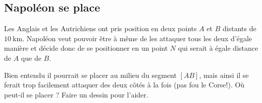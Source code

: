 
\subsection*{Napoléon se place}

Les Anglais et les Autrichiens ont pris position en deux points \( A\) et \( B\) distants de \( \SI{10}{\kilo\meter}\). Napoléon veut pouvoir être à même de les attaquer tous les deux d'égale manière et décide donc de se positionner en un point $N$ qui serait à égale distance de \( A\) que de \( B\).

Bien entendu il pourrait se placer au milieu du segment \( [AB]\), mais ainsi il se ferait trop facilement attaquer des deux côtés à la fois (pas fou le Corse!). Où peut-il se placer ? Faire un dessin pour l'aider.

